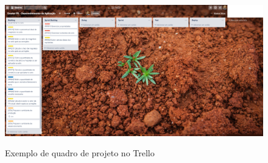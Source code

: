 \begin{anexosenv}
\begin{figure}[H]
    \centering
    \caption{Exemplo de quadro de projeto no Trello}
    \includegraphics[width=13cm]{dados/figuras/quadro_trello.png}
    \label{fig:exemploQuadroTrello}
\end{figure}


\end{anexosenv}